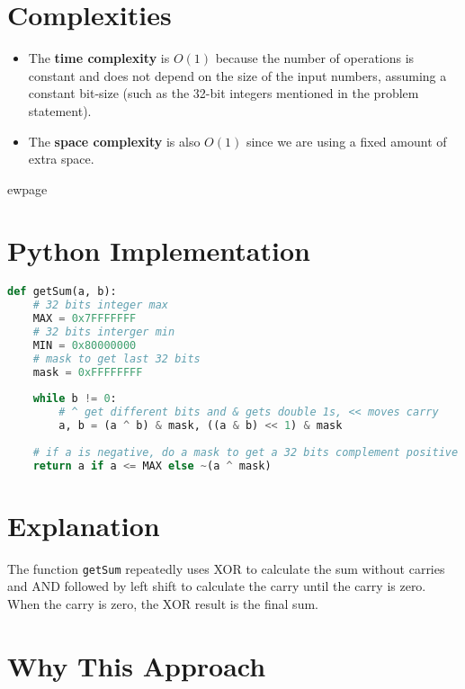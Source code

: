 \section*{Complexities}

\begin{itemize}
    \item The \textbf{time complexity} is $O(1)$ because the number of operations is constant and does not depend on the size of the input numbers, assuming a constant bit-size (such as the 32-bit integers mentioned in the problem statement).
    \item The \textbf{space complexity} is also $O(1)$ since we are using a fixed amount of extra space.
\end{itemize}


ewpage
\section*{Python Implementation}

\begin{fullwidth}
\begin{lstlisting}[language=Python]
def getSum(a, b):
    # 32 bits integer max
    MAX = 0x7FFFFFFF
    # 32 bits interger min
    MIN = 0x80000000
    # mask to get last 32 bits
    mask = 0xFFFFFFFF
    
    while b != 0:
        # ^ get different bits and & gets double 1s, << moves carry
        a, b = (a ^ b) & mask, ((a & b) << 1) & mask
        
    # if a is negative, do a mask to get a 32 bits complement positive number
    return a if a <= MAX else ~(a ^ mask)
\end{lstlisting}

\end{fullwidth}

\section*{Explanation}

The function \texttt{getSum} repeatedly uses XOR to calculate the sum without carries and AND followed by left shift to calculate the carry until the carry is zero. When the carry is zero, the XOR result is the final sum.

\section*{Why This Approach}

